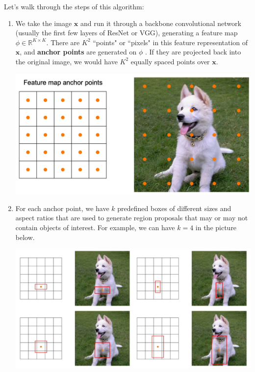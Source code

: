 \documentclass{article}
\theoremstyle{definition}
\theoremstyle{remark}
\theoremstyle{definition}
\begin{document}
      Let's walk through the steps of this algorithm: 
      \begin{enumerate}
          \item We take the image $\mathbf{x}$ and run it through a backbone convolutional network (usually the first few layers of ResNet or VGG), generating a feature map $\phi \in \mathbb{R}^{K \times K}$. There are $K^2$ ``points" or ``pixels" in this feature representation of $\mathbf{x}$, and \textbf{anchor points} are generated on $\phi$ . If they are projected back into the original image, we would have $K^2$ equally spaced points over $\mathbf{x}$. 
              \begin{center}
                  \includegraphics[scale=0.2]{Images/anchor_points.png}
              \end{center}
          \item For each anchor point, we have $k$ predefined boxes of different sizes and aspect ratios that are used to generate region proposals that may or may not contain objects of interest. For example, we can have $k = 4$ in the picture below. 
          \begin{center}
              \includegraphics[scale=0.2]{Images/anchor_boxes.png}
          \end{center}

\end{enumerate}
\end{document}

